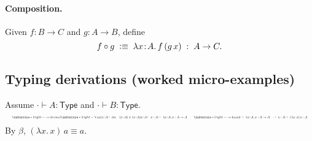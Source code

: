 \documentclass{article}
\newcommand{\Type}{\ensuremath{\mathsf{Type}}}
\newcommand{\defeq}{\vcentcolon\equiv}
\newcommand{\inl}{\mathsf{inl}}
\newcommand{\inr}{\mathsf{inr}}
\newcommand{\emptyctx}{\cdot}              %
\newcommand{\ctx}{\mathsf{ctx}}            %
\newcommand{\judg}[3]{#1 \vdash #2 : #3}   %
\newcommand{\jdeq}{\equiv}                 %
\newcommand{\rulename}[1]{\textsc{#1}}
\begin{document}
\paragraph{Composition.}
Given \(f:B\to C\) and \(g:A\to B\), define
\[
f \circ g \;\defeq\; \lambda x\!:\!A.\, f\,(g\,x) \;:\; A \to C.
\]

\subsection*{Typing derivations (worked micro-examples)}

Assume \(\emptyctx \vdash A:\Type\) and \(\emptyctx \vdash B:\Type\).
\[
\resizebox{\linewidth}{!}{$
\inferrule*[right=\rulename{\(\to\)-Intro}]{
  \inferrule*[right=\rulename{Var}]{
    x\!:\!A \vdash \ctx \quad (x\!:\!A)\in (x\!:\!A)
  }{
    \judg{x\!:\!A}{x}{A}
  }
}{
  \judg{\emptyctx}{\lambda x\!:\!A.\,x}{A \to A}
}
\qquad
\inferrule*[right=\rulename{\(\to\)-Elim}]{
  \judg{\emptyctx}{\lambda x\!:\!A.\,x}{A \to A}
  \quad
  \judg{\emptyctx}{a}{A}
}{
  \judg{\emptyctx}{(\lambda x.\,x)\,a}{A}
}
$}
\]
By \(\beta\), \((\lambda x.\,x)\,a \jdeq a\).




\end{document}
